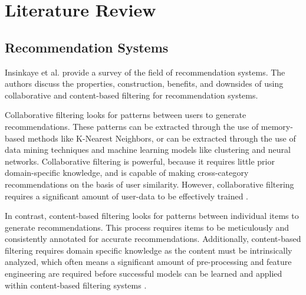 \documentclass[sigconf]{acmart}
\begin{document}


\maketitle

\section{Literature Review}
\subsection{Recommendation Systems}
Insinkaye et al. \cite{RSSurvey} provide a survey of the field of recommendation systems. The authors discuss the properties, construction, benefits, and downsides of using collaborative and content-based filtering for recommendation systems.

Collaborative filtering looks for patterns between users to generate recommendations. These patterns can be extracted through the use of memory-based methods like K-Nearest Neighbors, or can be extracted through the use of data mining techniques and machine learning models like clustering and neural networks. Collaborative filtering is powerful, because it requires little prior domain-specific knowledge, and is capable of making cross-category recommendations on the basis of user similarity. However, collaborative filtering requires a significant amount of user-data to be effectively trained \cite{RSSurvey}.

In contrast, content-based filtering looks for patterns between individual items to generate recommendations. This process requires items to be meticulously and consistently annotated for accurate recommendations. Additionally, content-based filtering requires domain specific knowledge as the content must be intrinsically analyzed, which often means a significant amount of pre-processing and feature engineering are required before successful models can be learned and applied within content-based filtering systems \cite{RSSurvey}.
\end{document}
